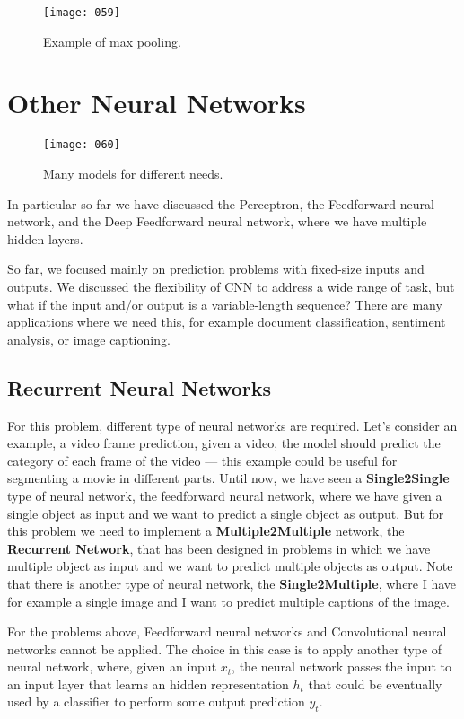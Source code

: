 \begin{figure}[h!]
    \centering
    \texttt{[image: 059]}
    \caption{Example of max pooling.}
    \label{fig:059}
\end{figure}

\section{Other Neural Networks}
\begin{figure}[t!]
    \centering
    \texttt{[image: 060]}
    \caption{Many models for different needs.}
    \label{fig:060}
\end{figure}

In particular so far we have discussed the Perceptron, the Feedforward neural network, and the Deep Feedforward neural network, where we have multiple hidden layers.

So far, we focused mainly on prediction problems with fixed-size inputs and outputs. We discussed the flexibility of CNN to address a wide range of task, but what if the input and/or output is a variable-length sequence? There are many applications where we need this, for example document classification, sentiment analysis, or image captioning.

\subsection{Recurrent Neural Networks}
For this problem, different type of neural networks are required. Let's consider an example, a video frame prediction, given a video, the model should predict the category of each frame of the video --- this example could be useful for segmenting a movie in different parts. Until now, we have seen a \textbf{Single2Single} type of neural network, the feedforward neural network, where we have given a single object as input and we want to predict a single object as output. But for this problem we need to implement a \textbf{Multiple2Multiple} network, the \textbf{Recurrent Network}, that has been designed in problems in which we have multiple object as input and we want to predict multiple objects as output. Note that there is another type of neural network, the \textbf{Single2Multiple}, where I have for example a single image and I want to predict multiple captions of the image.

For the problems above, Feedforward neural networks and Convolutional neural networks cannot be applied. The choice in this case is to apply another type of neural network, where, given an input \(x_t\), the neural network passes the input to an input layer that learns an hidden representation \(h_t\) that could be eventually used by a classifier to perform some output prediction \(y_t\).

